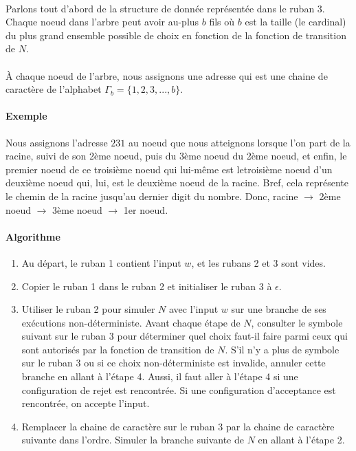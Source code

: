 \paragraph{}
Parlons tout d'abord de la structure de donnée représentée dans le ruban 3. Chaque noeud dans l'arbre peut avoir au-plus $b$ fils où $b$ est la taille (le cardinal) du plus grand ensemble possible de choix en fonction de la fonction de transition de $N$.

\paragraph{}
À chaque noeud de l'arbre, nous assignons une adresse qui est une chaine de caractère de l'alphabet $\Gamma_{b} = \{1, 2, 3, ..., b\}$. 

\paragraph{Exemple} Nous assignons l'adresse $231$ au noeud que nous atteignons lorsque l'on part de la racine, suivi de son 2ème noeud, puis du 3ème noeud du 2ème noeud, et enfin, le premier noeud de ce troisième noeud qui lui-même est letroisième noeud d'un deuxième noeud qui, lui, est le deuxième noeud de la racine. Bref, cela représente le chemin de la racine jusqu'au dernier digit du nombre. Donc, racine $\rightarrow$ 2ème noeud $\rightarrow$ 3ème noeud $\rightarrow$ 1er noeud.
\paragraph{Algorithme}
\begin{enumerate}
\item Au départ, le ruban 1 contient l'input $w$, et les rubans 2 et 3 sont vides.
\item Copier le ruban 1 dans le ruban 2 et initialiser le ruban 3 à $\epsilon$.
\item Utiliser le ruban 2 pour simuler $N$ avec l'input $w$ sur une branche de ses exécutions non-déterministe. Avant chaque étape de $N$, consulter le symbole suivant sur le ruban 3 pour déterminer quel choix faut-il faire parmi ceux qui sont autorisés par la fonction de transition de $N$. S'il n'y a plus de symbole sur le ruban 3 ou si ce choix non-déterministe est invalide, annuler cette branche en allant à l'étape 4. Aussi, il faut aller à l'étape 4 si une configuration de rejet est rencontrée. Si une configuration d'acceptance est rencontrée, on accepte l'input.
\item Remplacer la chaine de caractère sur le ruban 3 par la chaine de caractère suivante dans l'ordre. Simuler la branche suivante de $N$ en allant à l'étape 2.
\end{enumerate}

